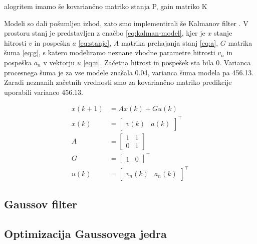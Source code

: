 alogritem
imamo še kovariančno matriko stanja P, gain matriko K 


Modeli so dali pošumljen izhod, zato smo implementirali še Kalmanov filter \cite{forsyth2002computer}. V prostoru stanj je predstavljen z enačbo \eqref{eq:kalman-model}, kjer je $x$ stanje hitrosti $v$ in pospeška $a$ \eqref{eq:stanje}, $A$ matrika prehajanja stanj \eqref{eq:a}, $G$ matrika šuma \eqref{eq:g}, s katero modeliramo neznane vhodne parametre hitrosti $v_n$ in pospeška $a_n$ v vektorju $u$ \eqref{eq:u}. Začetna hitrost in pospešek sta bila $0$. Varianca procesnega šuma je za vse modele znašala \num{0.04}, varianca šuma modela pa \num{456.13}. Zaradi neznanih začetnih vrednosti smo za kovariančno matriko predikcije uporabili varianco \num{456.13}.

\begin{subequations}
	\begin{align}
		x(k+1) &= A x(k) + G u(k) \label{eq:kalman-model} \\ 
        x(k) &= \begin{bmatrix}
					v(k) & a(k)
				\end{bmatrix}^\top \label{eq:stanje} \\
        A &= \begin{bmatrix}
				1 & 1 \\
                0 & 1
			\end{bmatrix} \label{eq:a} \\
       G &= \begin{bmatrix}
				1 & 0
			\end{bmatrix}^\top \label{eq:g} \\
       u(k) &= \begin{bmatrix}
					v_{n}(k) & a_n(k)
				\end{bmatrix}^\top \label{eq:u}
	\end{align}	
\end{subequations}

\subsection{Gaussov filter}\label{sec:gaussov-filter}



\subsection{Optimizacija Gaussovega jedra}


